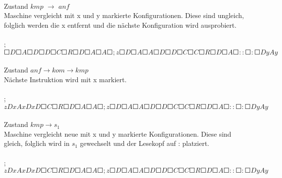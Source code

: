 \documentclass[10pt, a4paper]{article}
\begin{document}
\paragraph{}
Zustand $kmp$ $\rightarrow$ $anf$\\
Maschine vergleicht mit x und y markierte Konfigurationen. Diese sind ungleich, folglich werden die x entfernt und die nächste Konfiguration wird ausprobiert.\\
\begin{small}
\par
\paragraph{}
;$\Square D \Square  A \Square  D \Square  D \Square  C \Square  R \Square  D \Square  A \Square  A \Square  ; z  \Square D \Square  A \Square  A \Square  D \Square  D \Square  C \Square  C \Square  R \Square  D \Square  A  \Square  ::\Square : \Square D y A y$
\end{small}\par

\paragraph{}
Zustand $anf \rightarrow kom \rightarrow kmp$\\
Nächste Instruktion wird mit x markiert.\\
\begin{small}
\par
\paragraph{}
;$z D x  A x  D x  D \Square  C \Square  R \Square  D \Square  A \Square  A \Square  ; z  \Square D \Square  A \Square  A \Square  D \Square  D \Square  C \Square  C \Square  R \Square  D \Square  A  \Square  ::\Square : \Square D y A y$
\end{small}\par


\paragraph{}
Zustand $kmp \rightarrow s_1$\\
Maschine vergleicht neue mit x und y markierte Konfigurationen. Diese sind gleich, folglich wird in $s_1$ gewechselt und der Lesekopf auf : platziert.\\
\begin{small}
\par
\paragraph{}
;$z D x  A x  D x  D \Square  C \Square  R \Square  D \Square  A \Square  A \Square  ; z  \Square D \Square  A \Square  A \Square  D \Square  D \Square  C \Square  C \Square  R \Square  D \Square  A  \Square  ::\Square : \Square D y A y$
\end{small}\par
\end{document}
